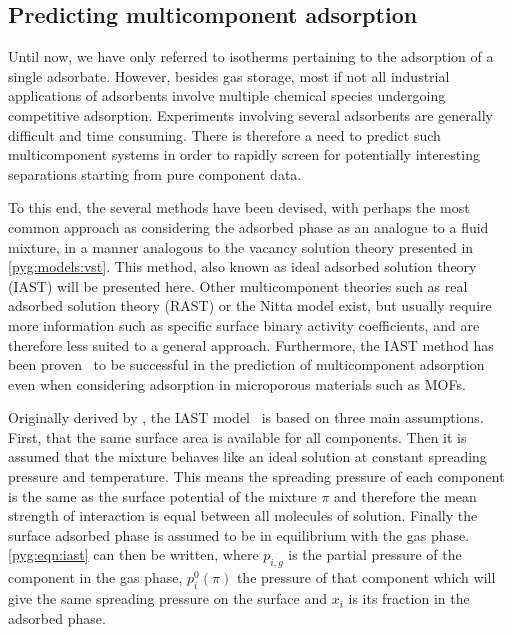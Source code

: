 
\subsection{Predicting multicomponent adsorption}\label{pyg:iast}

Until now, we have only referred to isotherms pertaining to the adsorption
of a single adsorbate. However, besides gas storage, most if not all
industrial applications of adsorbents involve multiple chemical
species undergoing competitive adsorption. Experiments involving
several adsorbents are generally difficult and time consuming.
There is therefore a need to predict such multicomponent systems
in order to rapidly screen for potentially interesting separations
starting from pure component data.

To this end, the several methods have been devised, with perhaps
the most common approach as considering the adsorbed phase as
an analogue to a fluid mixture, in a manner analogous to the
vacancy solution theory presented in \autoref{pyg:models:vst}.
This method, also known as ideal adsorbed solution theory (IAST)
will be presented here. Other multicomponent theories
such as real adsorbed solution theory (RAST) or the Nitta model
exist, but usually require more information such as specific
surface binary activity coefficients, and are therefore less suited to
a general approach. Furthermore, the IAST method has been
proven~\cite{cessfordEvaluationIdealAdsorbed2012,%
	vanheestIdentificationMetalOrganic2012} to be successful in the
prediction of multicomponent adsorption even when considering
adsorption in microporous materials such as MOFs.

Originally derived by \citeauthor{myersThermodynamicsMixedgasAdsorption1965},
the IAST model~\cite{myersThermodynamicsMixedgasAdsorption1965} is based
on three main assumptions. First, that the
same surface area is available for all components. Then it is
assumed that the mixture behaves like an ideal solution at constant
spreading pressure and temperature. This means the spreading pressure of
each component is the same as the surface potential of the mixture \(\pi\)
and therefore the mean strength of interaction is equal between all
molecules of solution. Finally the surface adsorbed phase is assumed
to be in equilibrium with the gas phase. \autoref{pyg:eqn:iast}
can then be written, where \(p_{i,g}\) is the partial pressure of
the component in the gas phase, \( p_i^0(\pi)\) the pressure of
that component which will give the same spreading pressure on the
surface and \(x_i\) is its fraction in the adsorbed phase.

